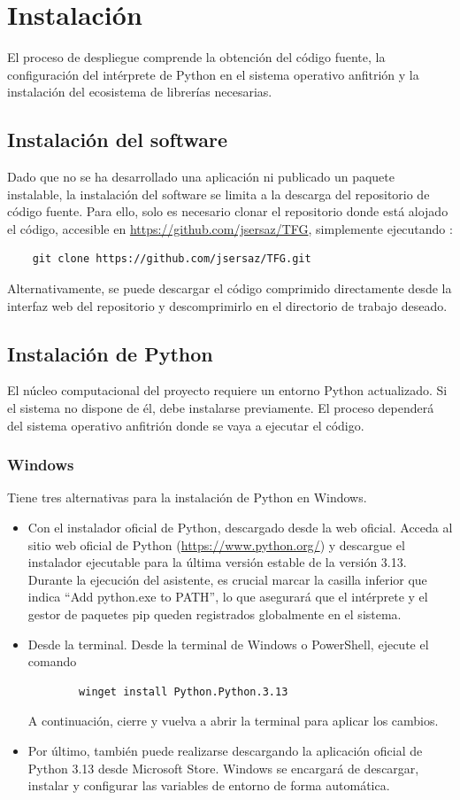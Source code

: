 \documentclass[a4paper,12pt,twoside,final]{book}
\begin{document}
\section{Instalación}
El proceso de despliegue comprende la obtención del código fuente, la configuración del intérprete de Python en el
sistema operativo anfitrión y la instalación del ecosistema de librerías necesarias.

\subsection{Instalación del software}
Dado que no se ha desarrollado una aplicación ni publicado un paquete instalable, la instalación del software se limita
a la descarga del repositorio de código fuente. Para ello, solo es necesario clonar el repositorio donde está alojado el
código, accesible en \url{https://github.com/jsersaz/TFG}, simplemente ejecutando  :
\begin{verbatim}
    git clone https://github.com/jsersaz/TFG.git
\end{verbatim}

Alternativamente, se puede descargar el código comprimido directamente desde la interfaz web del repositorio y
descomprimirlo en el directorio de trabajo deseado.

\subsection{Instalación de Python}
El núcleo computacional del proyecto requiere un entorno Python actualizado. Si el sistema no dispone de él, debe
instalarse previamente. El proceso dependerá del sistema operativo anfitrión donde se vaya a ejecutar el código.

\subsubsection{Windows}
Tiene tres alternativas para la instalación de Python en Windows.
\begin{itemize}
    \item Con el instalador oficial de Python, descargado desde la web oficial. Acceda al sitio web oficial de Python
    (\url{https://www.python.org/}) y descargue el instalador ejecutable para la última versión estable de la versión
    3.13. Durante la ejecución del asistente, es crucial marcar la casilla inferior que indica ``Add python.exe to PATH'',
    lo que asegurará que el intérprete y el gestor de paquetes pip queden registrados globalmente en el sistema.
    \item Desde la terminal. Desde la terminal de Windows o PowerShell, ejecute el comando
    \begin{verbatim}
        winget install Python.Python.3.13    
    \end{verbatim}
    A continuación, cierre y vuelva a abrir la terminal para aplicar los cambios.
    \item Por último, también puede realizarse descargando la aplicación oficial de Python 3.13 desde Microsoft Store.
    Windows se encargará de descargar, instalar y configurar las variables de entorno de forma automática.
\end{itemize}
\end{document}
